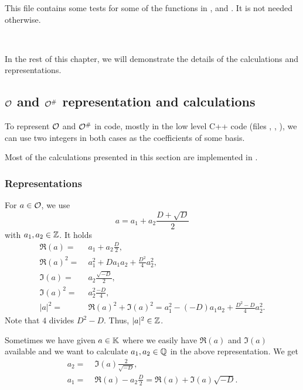 \subsubsection{}
This file contains some tests for some of the functions in ,  and . It is not needed otherwise.

\

In the rest of this chapter, we will demonstrate the details of the calculations and representations.


\subsection{$\mathcal{O}$ and $\mathcal{O}^\#$ representation and calculations}
\label{curlOcalcs}

To represent $\mathcal{O}$ and $\mathcal{O}^\#$ in code, mostly in the low level C++ code (files , , ), we can use two integers in both cases as the coefficients of some basis.

Most of the calculations presented in this section are implemented in .

\subsubsection{Representations}

\label{impl:repr:curlO}

For $a \in \mathcal{O}$, we use
\[ a = a_1 + a_2 \frac{D + \sqrt{D}} {2} \]
with $a_1,a_2 \in \mathbb{Z}$.
It holds
\begin{align*}
\Re(a) = &\; a_1 + a_2 \frac{D}{2} , \\
\Re(a)^2 =&\; a_1^2 + D a_1 a_2 + \frac{D^2}{4} a_2^2 , \\
\Im(a) =&\; a_2 \frac{\sqrt{-D}}{2} , \\
\Im(a)^2 =&\; a_2^2 \frac{-D}{4} , \\
|a|^2 =&\; \Re(a)^2 + \Im(a)^2 = a_1^2 - (-D) a_1 a_2 + \frac{D^2-D}{4} a_2^2 .
\end{align*}
Note that $4$ divides $D^2 - D$. Thus, $|a|^2 \in \mathbb{Z}$.

Sometimes we have given $a \in \mathbb{K}$ where we easily have $\Re(a)$ and $\Im(a)$ available and we want to calculate $a_1, a_2 \in \mathbb{Q}$ in the above representation. We get
\begin{align*}
a_2 = &\; \Im(a) \frac{2}{\sqrt{-D}}, \\
a_1 = &\; \Re(a) - a_2 \frac{D}{2} = \Re(a) + \Im(a) \sqrt{-D} .
\end{align*}

